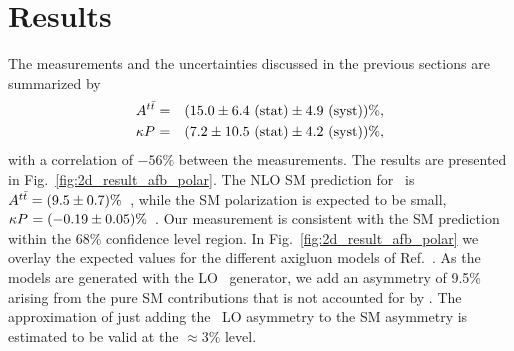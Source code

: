 \documentclass[aps,prd,twocolumn,showpacs,superscriptaddress,groupedaddress,floatfix]{revtex4}
\begin{document}
 
\makeatletter{}
\section{Results}\label{sec:measresults}\label{sec:conclusion}

The measurements and the uncertainties discussed in the previous sections are summarized by
\begin{eqnarray}
A^{t\bar t} &=& (15.0 \pm 6.4 \text{ (stat)} \pm 4.9 \text{ (syst)})\%,\nonumber\\
\kappa P^{}_{} &=& (7.2  \pm 10.5 \text{ (stat)} \pm 4.2 \text{ (syst)})\%,   \label{eq:final_result}
\end{eqnarray}
with a correlation of $-56\%$ between the  measurements.
The results are presented in Fig.~\ref{fig:2d_result_afb_polar}.
The NLO SM prediction for \Attfb\ is $A^{t\bar t} =  (9.5\pm 0.7)\% $~\cite{Czakon:2014xsa}, while  the SM polarization is expected to be small,  $\kappa P^{}_{}=(-0.19\pm 0.05)\% $~\cite{Bernreuther:2006vg}. Our measurement is consistent with the SM prediction within the 68\% confidence level region. 
In Fig.~\ref{fig:2d_result_afb_polar} we overlay the expected values for the different axigluon models of  Ref.~\cite{Carmona:2014gra}.
As the models are generated with the LO \madgraph\ generator,
we add an asymmetry of  9.5\% arising from the pure SM contributions
that is not accounted for by \madgraph.
The approximation of just adding the \madgraph\ LO asymmetry to the SM asymmetry is estimated to be valid at the $\approx 3\%$ level.
 
\end{document}
